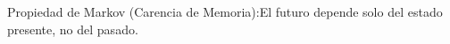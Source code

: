 \documentclass[preview]{standalone}
\begin{document}
\begin{center}
Propiedad de Markov (Carencia de Memoria):El futuro depende solo del estado presente, no del pasado.
\end{center}
\end{document}
